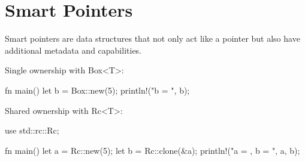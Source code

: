 \documentclass[8pt,a4paper,twocolumn]{extarticle}
\begin{document}
\section{Smart Pointers}
Smart pointers are data structures that not only act like a pointer but also have additional metadata and capabilities.

Single ownership with Box<T>:
\begin{Code}
    fn main() {
        let b = Box::new(5);
        println!("b = {}", b);
    }
\end{Code}

Shared ownership with Rc<T>:
\begin{Code}
    use std::rc::Rc;

    fn main() {
        let a = Rc::new(5);
        let b = Rc::clone(&a);
        println!("a = {}, b = {}", a, b);
    }
\end{Code}
\end{document}
